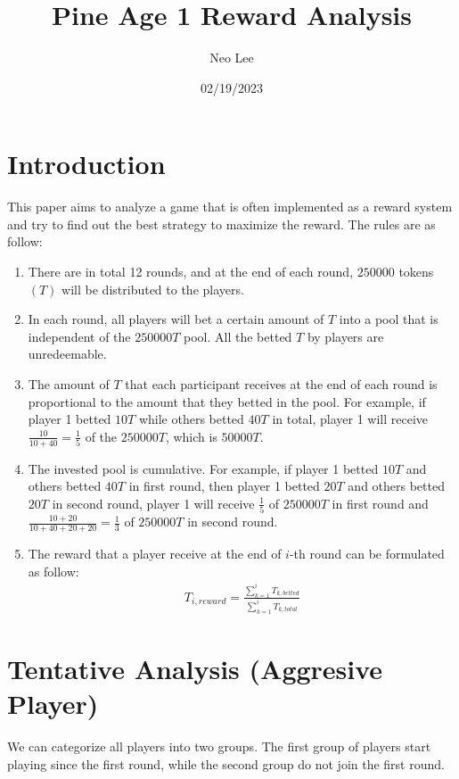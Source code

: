 \documentclass{article}
\title{Pine Age 1 Reward Analysis}
\author{Neo Lee}
\date{02/19/2023}
\begin{document}
 

\maketitle 

\section*{Introduction}
This paper aims to analyze a game that is often implemented as a reward system and try to find out the best strategy to maximize the reward.
The rules are as follow:

\begin{enumerate}
    \item 
    There are in total 12 rounds, and at the end of each round, $\num{250000}$ tokens $(T)$ will be distributed to the players.

    \item
    In each round, all players will bet a certain amount of $T$ into a pool that is independent of the $\num{250000}T$ pool. 
    All the betted $T$ by players are unredeemable. 

    \item
    The amount of $T$ that each participant receives at the end of each round is proportional to the amount that they betted in the pool. 
    For example, if player 1 betted $10T$ while others betted $40T$ in total, player 1 will receive $\frac{10}{10+40}=\frac{1}{5}$ of the $\num{250000}T$, which is $\num{50000}T$.

    \item 
    The invested pool is cumulative. For example, if player 1 betted $10T$ and others betted $40T$ in first round, then player 1 betted $20T$ and others betted $20T$ in second round, player 1 will receive $\frac{1}{5}$ of $\num{250000}T$ in first round and $\frac{10+20}{10+40+20+20}=\frac{1}{3}$ of $\num{250000}T$ in second round.

    \item
    The reward that a player receive at the end of $i$-th round can be formulated as follow: 
    \begin{align}
        T_{i,reward} = \frac{\sum_{k=1}^{i}T_{k,betted}}{\sum_{k=1}^{i}T_{k,total}}
    \end{align}
\end{enumerate}

\section*{Tentative Analysis (Aggresive Player)}
We can categorize all players into two groups.
The first group of players start playing since the first round, while the second group do not join the first round.
\end{document}
